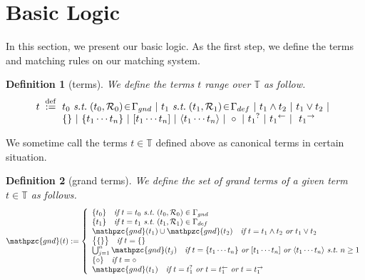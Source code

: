 \documentclass[12pt]{article}
\newtheorem{Definition}{Definition}[section]
\begin{document}
\section{Basic Logic}
In this section, we present our basic logic. As the first step, we define
the terms and matching rules on our matching system.

\begin{Definition}[terms]
  We define the terms $t$ range over $\mathbb{T}$ as follow.
  \[ t \;\stackrel{\mathrm{def}}{:=}\!
      \begin{array}[t]{l}
             t_0 \ \text{\it s.t.}\; (t_0, \mathcal{R}_0) \!\in\!
              \Gamma_{gnd}\ |\ 
             t_1 \ \text{\it s.t.}\; (t_1, \mathcal{R}_1) \!\in\!
              \Gamma_{def}\ |\
             t_1 \wedge t_2
        \ |\ t_1 \vee t_2 \ |  \\
        \{\} \ |\ \{t_1 \cdots t_n \}
        \ |\ [t_1 \cdots t_n ]
        \ |\ \langle t_1 \cdots t_n \rangle \ |\
        \circ \ |\  {t_1}^? \ |\ {t_1}^{\leftarrow} \ |\
        \ {t_1}^{\rightarrow} 
      \end{array}
  \]
\end{Definition}

We sometime call the terms $t \in \mathbb{T}$ defined above as canonical
terms in certain situation.


\begin{Definition}[grand terms]
  We define the set of grand terms of a given term $t \in \mathbb{T}$ as
  follows.
  \begin{displaymath}
    \mathpzc{gnd}(t) := \left\{\begin{array}{l}
      \{t_0\} \quad \text{\it if}\ t = t_0\
       \text{\it s.t.}\ (t_0,\mathcal{R}_0) \in \Gamma_{gnd}  \\
      \{t_1\} \quad \text{\it if}\ t = t_1\
       \text{\it s.t.}\ (t_1,\mathcal{R}_1) \in \Gamma_{def}  \\
      \mathpzc{gnd}(t_1) \cup \mathpzc{gnd}(t_2) \quad \text{\it if}\ t = t_1
       \wedge t_2\ \text{\it or}\ t_1 \vee t_2  \\
      \bigl\{ \{\} \bigr\} \quad \text{\it if}\ t = \{\}  \\
       \bigcup_{j=1}^{n}\mathpzc{gnd}(t_j) \quad \text{\it if}\
      t = \{t_1 \cdots t_n\}\ \text{\it or}\ [t_1 \cdots t_n]\ \text{\it or}\
       \langle t_1 \cdots t_n \rangle\ \text{\it s.t.}\ n \ge 1  \\
      \{\circ\} \quad \text{\it if}\ t = \circ  \\
       \mathpzc{gnd}(t_1) \quad \text{\it if}\ t = t_1^?\ \text{\it or}\
      t = t_1^{\leftarrow}\ \text{\it or}\ t = t_1^{\rightarrow}
    \end{array}\right.
  \end{displaymath}
\end{Definition}
\end{document}
